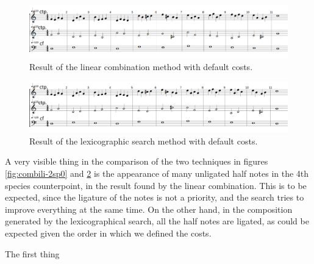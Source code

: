 \begin{figure}[h]
    \centering
    \includegraphics[width=1\textwidth]{Images/Experiments/linear-combination-2sp.png}
    \caption{Result of the linear combination method with default costs.}
    \label{fig:combili-2sp}
\end{figure}

\begin{figure}[h]
    \centering
    \includegraphics[width=1\textwidth]{Images/Experiments/basic-lexico-2sp.png}
    \caption{Result of the lexicographic search method with default costs.}
    \label{fig:lexico-2sp}
\end{figure}
 
A very visible thing in the comparison of the two techniques in figures \ref{fig:combili-2sp0}  and \ref{fig:lexico-2sp} is the appearance of many unligated half notes in the 4th species counterpoint, in the result found by the linear combination. This is to be expected, since the ligature of the notes is not a priority, and the search tries to improve everything at the same time. On the other hand, in the composition generated by the lexicographical search, all the half notes are ligated, as could be expected given the order in which we defined the costs.

The first thing 
